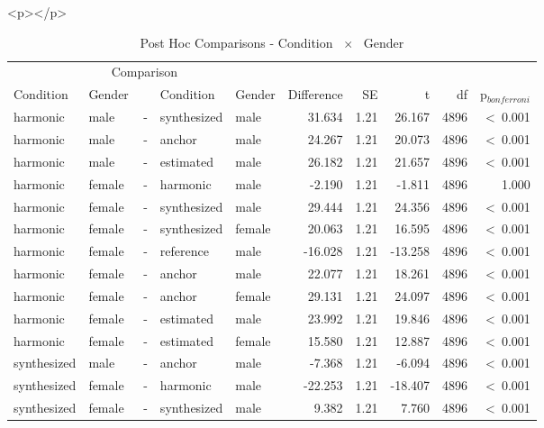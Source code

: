 \documentclass[a4paper,man,hidelinks,floatsintext]{apa7}
\begin{document}
        <p></p>
      
    
\begin{table}[!htbp]
\caption{Post Hoc Comparisons - Condition ~$\times$~ Gender}
\label{tab:Table_8}
\begin{adjustbox}{max size={\columnwidth}{\textheight}}
\centering
\begin{tabular}{llrllrrrrr}
\hline
\multicolumn{5}{c}{Comparison} & \multicolumn{5}{c}{~} \\
\cline{1-5}
Condition   & Gender & ~ & Condition   & Gender & Difference &   SE &       t &   df & p$_{bonferroni}$ \\
\hline
harmonic    & male   & - & synthesized & male   &     31.634 & 1.21 &  26.167 & 4896 &  \textless~0.001 \\
harmonic    & male   & - & anchor      & male   &     24.267 & 1.21 &  20.073 & 4896 &  \textless~0.001 \\
harmonic    & male   & - & estimated   & male   &     26.182 & 1.21 &  21.657 & 4896 &  \textless~0.001 \\
harmonic    & female & - & harmonic    & male   &     -2.190 & 1.21 &  -1.811 & 4896 &            1.000 \\
harmonic    & female & - & synthesized & male   &     29.444 & 1.21 &  24.356 & 4896 &  \textless~0.001 \\
harmonic    & female & - & synthesized & female &     20.063 & 1.21 &  16.595 & 4896 &  \textless~0.001 \\
harmonic    & female & - & reference   & male   &    -16.028 & 1.21 & -13.258 & 4896 &  \textless~0.001 \\
harmonic    & female & - & anchor      & male   &     22.077 & 1.21 &  18.261 & 4896 &  \textless~0.001 \\
harmonic    & female & - & anchor      & female &     29.131 & 1.21 &  24.097 & 4896 &  \textless~0.001 \\
harmonic    & female & - & estimated   & male   &     23.992 & 1.21 &  19.846 & 4896 &  \textless~0.001 \\
harmonic    & female & - & estimated   & female &     15.580 & 1.21 &  12.887 & 4896 &  \textless~0.001 \\
synthesized & male   & - & anchor      & male   &     -7.368 & 1.21 &  -6.094 & 4896 &  \textless~0.001 \\
synthesized & female & - & harmonic    & male   &    -22.253 & 1.21 & -18.407 & 4896 &  \textless~0.001 \\
synthesized & female & - & synthesized & male   &      9.382 & 1.21 &   7.760 & 4896 &  \textless~0.001 \\

\end{tabular}
\end{adjustbox}
\end{table}
\end{document}
